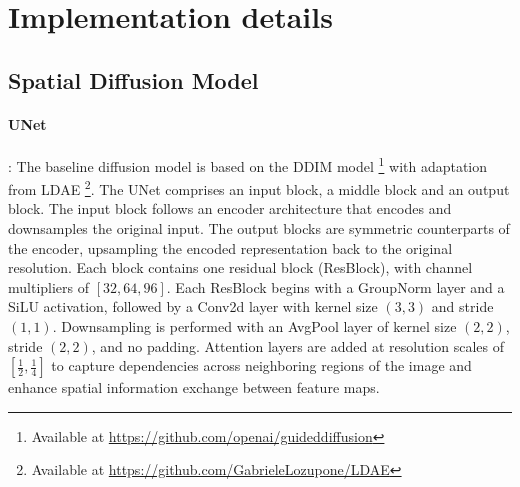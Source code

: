     
    

    




\section{Implementation details}
\label{sec:implementation}

\subsection{Spatial Diffusion Model}

\paragraph{UNet}: The baseline diffusion model is based on the DDIM model \cite{songDDIM}\footnote{Available at \href{https://github.com/openai/guideddiffusion}{https://github.com/openai/guideddiffusion}} with adaptation from LDAE \cite{lozuponeLDAE2025} \footnote{Available at \href{https://github.com/GabrieleLozupone/LDAE}{https://github.com/GabrieleLozupone/LDAE}}. The UNet comprises an input block, a middle block and an output block. The input block follows an encoder architecture that encodes and downsamples the original input. The output blocks are symmetric counterparts of the encoder, upsampling the encoded representation back to the original resolution. Each block contains one residual block (ResBlock), with channel multipliers of $[32, 64, 96]$. Each ResBlock begins with a GroupNorm layer and a SiLU activation, followed by a Conv2d layer with kernel size $(3, 3)$ and stride $(1, 1)$. Downsampling is performed with an AvgPool layer of kernel size $(2, 2)$, stride $(2, 2)$, and no padding. Attention layers are added at resolution scales of $[\tfrac{1}{2}, \tfrac{1}{4}]$ to capture dependencies across neighboring regions of the image and enhance spatial information exchange between feature maps. 
